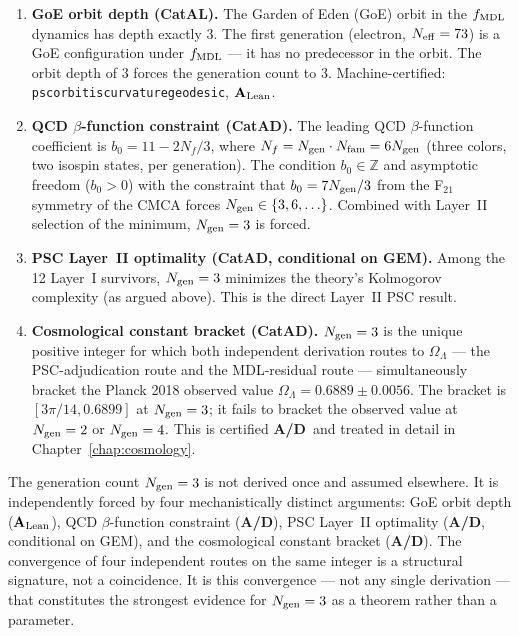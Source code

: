 \documentclass[11pt,openany]{book}
\theoremstyle{remark}
\newcommand{\lean}[1]{%
  \penalty-100
  \begingroup\def\_{\textunderscore\allowbreak}\texttt{#1}\endgroup}
\newcommand{\Ngen}{N_{\rm gen}}
\newcommand{\CatAL}{\ensuremath{\textbf{A}_{\rm Lean}}}
\newcommand{\CatAD}{\textbf{A/D}}
\begin{document}
\begin{enumerate}[leftmargin=1.8cm,label=(\arabic*)]
\item \textbf{GoE orbit depth (CatAL).}
  The Garden of Eden (GoE) orbit in the $f_{\rm MDL}$ dynamics has depth exactly 3.
  The first generation (electron, $N_{\rm eff} = 73$) is a GoE configuration under
  $f_{\rm MDL}$ --- it has no predecessor in the orbit. The orbit depth of 3 forces
  the generation count to 3. Machine-certified: \lean{psc\_orbit\_is\_curvature\_geodesic},
  \CatAL.

\item \textbf{QCD $\beta$-function constraint (CatAD).}
  The leading QCD $\beta$-function coefficient is
  $b_0 = 11 - 2N_f/3$, where $N_f = \Ngen \cdot N_{\rm fam} = 6\Ngen$
  (three colors, two isospin states, per generation).
  The condition $b_0 \in \mathbb{Z}$ and asymptotic freedom ($b_0 > 0$)
  with the constraint that $b_0 = 7\Ngen/3$ from the F$_{21}$ symmetry of
  the CMCA forces $\Ngen \in \{3, 6, \ldots\}$. Combined with Layer~II selection
  of the minimum, $\Ngen = 3$ is forced.

\item \textbf{PSC Layer~II optimality (CatAD, conditional on GEM).}
  Among the 12 Layer~I survivors, $\Ngen = 3$ minimizes the theory's Kolmogorov
  complexity (as argued above). This is the direct Layer~II PSC result.

\item \textbf{Cosmological constant bracket (CatAD).}
  $\Ngen = 3$ is the unique positive integer for which both independent derivation
  routes to $\Omega_\Lambda$ --- the PSC-adjudication route and the MDL-residual route
  --- simultaneously bracket the Planck 2018 observed value
  $\Omega_\Lambda = 0.6889 \pm 0.0056$. The bracket is $[3\pi/14, 0.6899]$ at
  $\Ngen = 3$; it fails to bracket the observed value at $\Ngen = 2$ or $\Ngen = 4$.
  This is certified \CatAD\ and treated in detail in Chapter~\ref{chap:cosmology}.
\end{enumerate}

\begin{tcolorbox}[colback=orange!5,colframe=orange!60,
  title={Result: $\Ngen = 3$ from Four Independent Mechanisms}]
The generation count $\Ngen = 3$ is not derived once and assumed elsewhere. It is
independently forced by four mechanistically distinct arguments: GoE orbit depth (\CatAL), QCD $\beta$-function constraint (\CatAD), PSC Layer~II optimality (\CatAD,
conditional on GEM), and the cosmological constant bracket (\CatAD). The convergence
of four independent routes on the same integer is a structural signature, not a
coincidence. It is this convergence --- not any single derivation --- that constitutes
the strongest evidence for $\Ngen = 3$ as a theorem rather than a parameter.
\end{tcolorbox}
\end{document}
